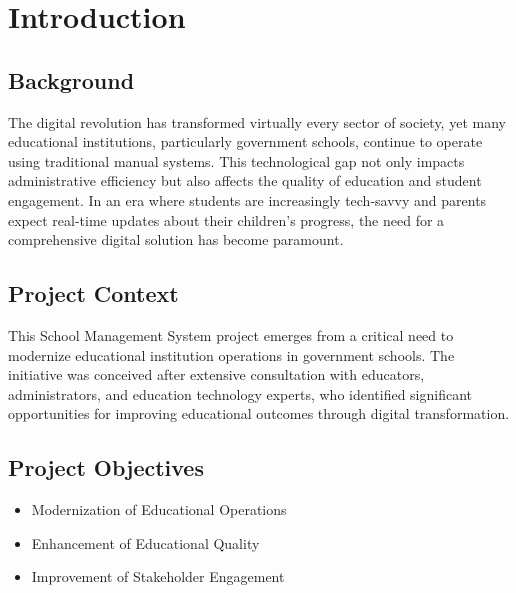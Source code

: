 \documentclass[12pt,a4paper]{report}
\renewcommand{\thepage}{\roman{page}}
\begin{document}
\newpage
\tableofcontents
\newpage
\renewcommand{\thepage}{\arabic{page}} %

\chapter{Introduction}
\section{Background}
The digital revolution has transformed virtually every sector of society, yet many educational institutions, particularly government schools, continue to operate using traditional manual systems. This technological gap not only impacts administrative efficiency but also affects the quality of education and student engagement. In an era where students are increasingly tech-savvy and parents expect real-time updates about their children's progress, the need for a comprehensive digital solution has become paramount.

\section{Project Context}
This School Management System project emerges from a critical need to modernize educational institution operations in government schools. The initiative was conceived after extensive consultation with educators, administrators, and education technology experts, who identified significant opportunities for improving educational outcomes through digital transformation.

\section{Project Objectives}
\begin{itemize}
    \item Modernization of Educational Operations
    \item Enhancement of Educational Quality
    \item Improvement of Stakeholder Engagement
\end{itemize}
\end{document}
